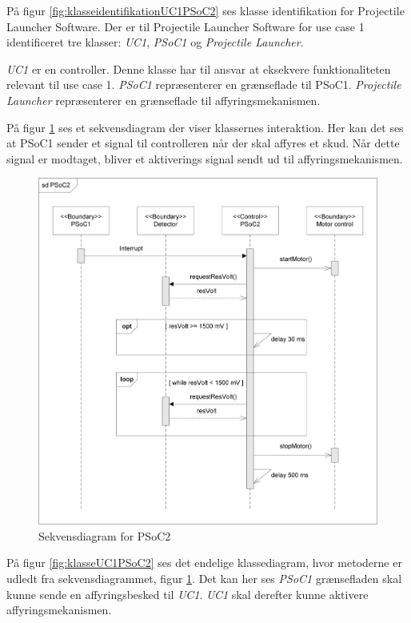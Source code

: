 På figur \ref{fig:klasseidentifikationUC1PSoC2} ses klasse identifikation for Projectile Launcher Software. Der er til Projectile Launcher Software for use case 1 identificeret tre klasser: \textit{UC1}, \textit{PSoC1} og \textit{Projectile Launcher}.

\textit{UC1} er en controller. Denne klasse har til ansvar at eksekvere funktionaliteten relevant til use case 1. \textit{PSoC1} repræsenterer en grænseflade til PSoC1. \textit{Projectile Launcher} repræsenterer en grænseflade til affyringsmekanismen.

På figur \ref{fig:sekvensUC1PSoC2} ses et sekvensdiagram der viser klassernes interaktion. Her kan det ses at PSoC1 sender et signal til controlleren når der skal affyres et skud. Når dette signal er modtaget, bliver et aktiverings signal sendt ud til affyringsmekanismen.

\begin{figure}[H]
	\centering
	\includegraphics[scale=0.8]{Systemarkitektur/images/PSoC2sekvens}
	\caption{Sekvensdiagram for PSoC2}
	\label{fig:sekvensUC1PSoC2}
\end{figure}

På figur \ref{fig:klasseUC1PSoC2} ses det endelige klassediagram, hvor metoderne er udledt fra sekvensdiagrammet, figur \ref{fig:sekvensUC1PSoC2}. Det kan her ses \textit{PSoC1} grænsefladen skal kunne sende en affyringsbesked til \textit{UC1}. \textit{UC1} skal derefter kunne aktivere affyringsmekanismen. 

